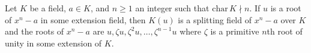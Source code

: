 Let $K$ be a field, $a \in K$, and $n \geq 1$ an integer such that $\mathrm{char}\,K \nmid n$. If $u$ is a root of $x^n - a$ in some extension field, then $K(u)$ is a splitting field of $x^n - a$ over $K$ and the roots of $x^n - a$ are $u, \zeta u, \zeta^2 u, \ldots, \zeta^{n-1} u$ where $\zeta$ is a primitive $n$th root of unity in some extension of $K$.

